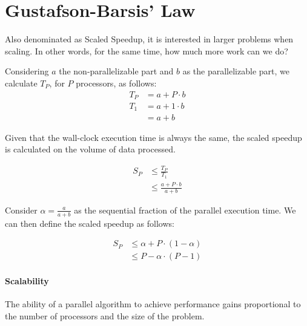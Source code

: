 \section{Gustafson-Barsis’ Law}


Also denominated as Scaled Speedup, it is interested in larger problems when scaling.
In other words, for the same time, how much more work can we do?

Considering $a$ the non-parallelizable part and $b$ as the parallelizable part,
we calculate $T_P$, for $P$ processors, as follows:
\begin{equation}
    \begin{split}
        T_P & = a + P \cdot b\\
        T_1 & = a + 1 \cdot b\\
        & = a + b
    \end{split}
\end{equation}

Given that the wall-clock execution time is always the same,
the scaled speedup is calculated on the volume of data processed.

\begin{equation}
    \begin{split}
        S_P & \le \frac{T_P}{T_1}\\
        & \le \frac{a + P \cdot b}{a + b}
    \end{split}
\end{equation}

Consider $\alpha = \frac{a}{a+b}$ as the sequential fraction of the parallel execution time.
We can then define the scaled speedup as follows:

\begin{equation}
    \begin{split}
        S_P & \le \alpha + P \cdot (1-\alpha)\\
        & \le P - \alpha \cdot (P-1)
    \end{split}
\end{equation}

\paragraph{Scalability}
The ability of a parallel algorithm to achieve performance gains proportional to the number of processors and the size of the problem.

